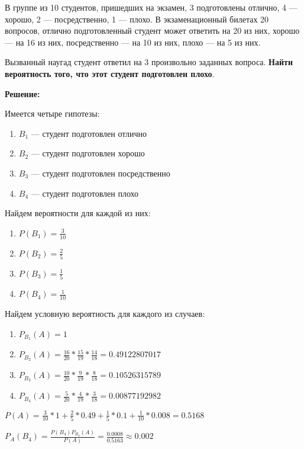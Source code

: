 \documentclass{article}
\begin{document}
В группе из 10 студентов, пришедших на экзамен, 3 подготовлены отлично, 4 — хорошо, 2 — посредственно, 1 — плохо. В экзаменационный билетах 20 вопросов, отлично подготовленный студент может ответить на 20 из них, хорошо — на 16 из них, посредственно — на 10 из них, плохо — на 5 из них.

Вызванный наугад студент ответил на 3 произвольно заданных вопроса. \textbf{Найти вероятность того, что этот студент подготовлен плохо}.

\textbf{Решение:}

Имеется четыре гипотезы:

\begin{enumerate}
    \item $B_{1}$ — студент подготовлен отлично
    \item $B_{2}$ — студент подготовлен хорошо
    \item $B_{3}$ — студент подготовлен посредственно
    \item $B_{4}$ — студент подготовлен плохо
\end{enumerate}

Найдем вероятности для каждой из них:

\begin{enumerate}
    \item $P(B_1) = \frac{3}{10}$
    \item $P(B_2) = \frac{2}{5}$
    \item $P(B_3) = \frac{1}{5}$
    \item $P(B_4) = \frac{1}{10}$
\end{enumerate}

Найдем условную вероятность для каждого из случаев:

\begin{enumerate}
    \item $P_{B_1}(A) = 1$
    \item $P_{B_2}(A) = \frac{16}{20} * \frac{15}{19} * \frac{14}{18} = 0.49122807017$
    \item $P_{B_3}(A) = \frac{10}{20} * \frac{9}{19} * \frac{8}{18} = 0.10526315789$
    \item $P_{B_4}(A) = \frac{5}{20} * \frac{4}{19} * \frac{3}{18} = 0.00877192982$
\end{enumerate}

$P(A) = \frac{3}{10} * 1 + \frac{2}{5} * 0.49 + \frac{1}{5} * 0.1 + \frac{1}{10} * 0.008 = 0.5168$

$P_{A}(B_4) = \frac{P(B_4) P_{B_4}(A)}{P(A)} = \frac{0.0008}{0.5163} \approx 0.002$
\end{document}
